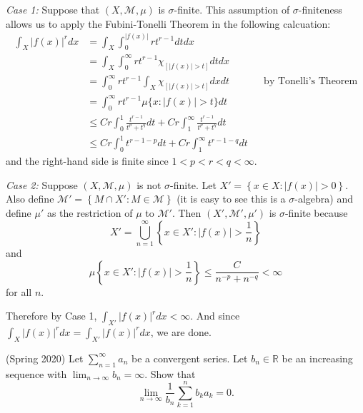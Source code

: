 \documentclass{exam}
\theoremstyle{problemstyle}
\newcommand{\vt}{\vskip 5mm} %
\newcommand{\1}[1]{\textbf{1}_{\left[#1\right]}} %
\def\R{\mathbb{R}} %
\begin{document}
\begin{questions}
\begin{solution}
  \textit{Case 1:} Suppose that $(X,\mathcal{M},\mu)$ is $\sigma$-finite. This assumption of $\sigma$-finiteness allows us to apply the Fubini-Tonelli Theorem in the following calcuation:
  \begin{align*}
    \int_{X}|f(x)|^{r}dx
    &= \int_{X} \int_{0}^{|f(x)|}r t^{r-1}dt dx\\
    &=\int_{X} \int_{0}^{\infty}  rt^{r-1}\chi_{[ |f(x)|>t]}dtdx \\
    &=\int_{0}^{\infty}r t^{r-1}\int_{X} \chi_{[ |f(x)|>t]}dxdt &&\text{by Tonelli's Theorem}\\
    &=\int_{0}^{\infty}r t^{r-1}\mu\{x: |f(x)|>t\}dt\\ 
    &\leq Cr\int_{0}^{1}\frac{t^{r-1}}{t^{p}+t^{q}}dt + Cr\int_{1}^{\infty} \frac{t^{r-1}}{t^{p}+t^{q}}dt\\ 
    &\leq Cr\int_{0}^{1}t^{r-1-p}dt + Cr\int_{1}^{\infty} t^{r-1-q}dt
  \end{align*}
  and the right-hand side is finite since $1<p<r<q<\infty$.
  
  \vt
  \textit{Case 2:} Suppose $(X,\mathcal{M},\mu)$ is not $\sigma$-finite. Let $X'= \left\{ x\in X: |f(x)|>0 \right\}$. Also define $\mathcal{M}'=\left\{ M\cap X' : M\in \mathcal{M} \right\}$ (it is easy to see this is a $\sigma$-algebra) and define $\mu'$ as the restriction of $\mu$ to $\mathcal{M}'$. Then $(X',\mathcal{M}',\mu')$ is $\sigma$-finite because
  \begin{equation*}
    X'= \bigcup_{n=1}^{\infty}\left\{ x\in X': |f(x)|>\frac{1}{n} \right\}
  \end{equation*}
  and 
  \begin{equation*}
    \mu\left\{ x\in X': |f(x)|>\frac{1}{n} \right\} \leq \frac{C}{n^{-p}+n^{-q}}<\infty
  \end{equation*}
  for all $n$.

  Therefore by Case 1, $\int_{X'}|f(x)|^{r}dx<\infty$. And since $\int_{X}|f(x)|^{r}dx = \int_{X'}|f(x)|^{r}dx$, we are done. 
  \end{solution}

\question (Spring 2020)
Let $\sum_{n=1}^{\infty}a_{n}$ be a convergent series. Let $b_{n}\in\R$ be an increasing sequence with $\lim_{n\to\infty}b_{n}=\infty$. Show that
\begin{equation*}
  \lim_{n\to\infty} \frac{1}{b_{n}}\sum_{k=1}^{n}b_{k}a_{k} = 0.
\end{equation*}


\end{questions}
\end{document}
